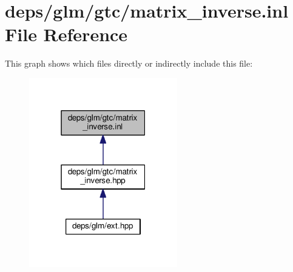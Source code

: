 \hypertarget{matrix__inverse_8inl}{}\section{deps/glm/gtc/matrix\+\_\+inverse.inl File Reference}
\label{matrix__inverse_8inl}
This graph shows which files directly or indirectly include this file\+:
\nopagebreak
\begin{figure}[H]
\begin{center}
\leavevmode
\includegraphics[width=183pt]{dd/dd1/matrix__inverse_8inl__dep__incl}
\end{center}
\end{figure}
